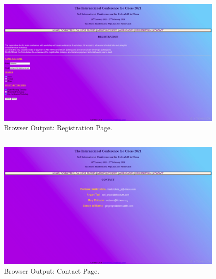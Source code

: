 \documentclass[12pt, a4]{article}
\begin{document}
\subsection*{}
\begin{figure}[h]
\centering
\caption{Browser Output: Registration Page.}
\includegraphics[scale= 0.25]{Output/Registration.png}
\end{figure}

\newpage
\subsection*{}
\begin{figure}[h]
\centering
\caption{Browser Output: Contact Page.}
\includegraphics[scale= 0.25]{Output/Contact.png}
\end{figure}

\newpage
\end{document}
